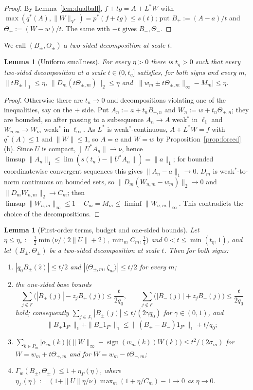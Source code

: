 \documentclass[10pt]{amsart}
\newtheorem{lemma}[theorem]{Lemma}
\theoremstyle{definition}
\theoremstyle{remark}
\newcommand{\sgn}{\operatorname{sign}}
\newcommand{\zh}{\hat z}
\newcommand{\ip}[2]{\langle #1,#2\rangle}
\begin{document}
\begin{proof}
By Lemma~\ref{lem:dualball}, $f+tg=A+L^*W$ with $\max(q^*(A),\|W\|_{V^*})=
p^*(f+tg)\le s(t)$; put $B_+:=(A-a)/t$ and $\Theta_+:=(W-w)/t$.  The same
with $-t$ gives $B_-,\Theta_-$.
\end{proof}

We call $(B_\pm,\Theta_\pm)$ a \emph{two-sided decomposition at scale $t$}.

\begin{lemma}[Uniform smallness]\label{lem:smallness}
For every $\eta>0$ there is $t_\eta>0$ such that every two-sided
decomposition at a scale $t\in(0,t_\eta]$ satisfies, for both signs and
every $m$, $\|tB_\pm\|_1\le\eta$, $\|D_m(t\Theta_{\pm,m})\|_2\le\eta$ and
$\big|\|w_m\pm t\Theta_{\pm,m}\|_\infty-M_m\big|\le\eta$.
\end{lemma}

\begin{proof}
Otherwise there are $t_n\to0$ and decompositions violating one of the
inequalities, say on the $+$ side.  Put $A_n:=a+t_nB_{+,n}$ and
$W_n:=w+t_n\Theta_{+,n}$; they are bounded, so after passing to a
subsequence $A_n\to A$ weak$^*$ in $\ell_1$ and $W_{n,m}\to W_m$ weak$^*$ in
$\ell_\infty$.  As $L^*$ is weak$^*$-continuous, $A+L^*W=f$ with
$q^*(A)\le1$ and $\|W\|\le1$, so $A=a$ and $W=w$ by
Proposition~\ref{prop:forced}(b).  Since $U$ is compact, $\|U^*A_n\|\to\nu$,
hence $\limsup\|A_n\|_1\le\lim(s(t_n)-\|U^*A_n\|)=\|a\|_1$; for bounded
coordinatewise convergent sequences this gives $\|A_n-a\|_1\to0$.  $D_m$ is
weak$^*$-to-norm continuous on bounded sets, so $\|D_m(W_{n,m}-w_m)\|_2\to0$
and $\|D_mW_{n,m}\|_2\to C_m$; then $\limsup\|W_{n,m}\|_\infty\le
1-C_m=M_m\le\liminf\|W_{n,m}\|_\infty$.  This contradicts the choice of the
decompositions.
\end{proof}

\begin{lemma}[First-order terms, budget and one-sided bounds]\label{lem:budget}
Let $\eta\le\eta_*:=\frac12\min\big(\nu/(2\|U\|+2),\min_mC_m,\frac14\big)$
and $0<t\le\min(t_\eta,1)$, and let $(B_\pm,\Theta_\pm)$ be a two-sided
decomposition at scale $t$.  Then for both signs:
\begin{enumerate}
\item[(a)] $|q_0B_\pm(\zh)|\le t/2$ and $|\ip{\Theta_{\pm,m}}{\zeta_m}|\le
t/2$ for every $m$;
\item[(b)] the one-sided base bounds
\[
 \sum_{j\notin F}\big(|B_+(j)|-z_jB_+(j)\big)\le\frac t{2q_0},\qquad
 \sum_{j\notin F}\big(|B_-(j)|+z_jB_-(j)\big)\le\frac t{2q_0}
\]
hold; consequently $\sum_{j\in J_\gamma}|B_\pm(j)|\le t/(2\gamma q_0)$ for
$\gamma\in(0,1)$, and
\[
 \|B_+1_{F^c}\|_1+\|B_-1_{F^c}\|_1\le\|(B_+-B_-)1_{F^c}\|_1+t/q_0;
\]
\item[(c)] $\sum_{k\in P_m}|\alpha_m(k)|\big(\|W\|_\infty-\sgn(w_m(k))W(k)
\big)\le t^2/(2\sigma_m)$ for $W=w_m+t\Theta_{+,m}$ and for
$W=w_m-t\Theta_{-,m}$;
\item[(d)] $\Gamma_w(B_\pm,\Theta_\pm)\le1+\eta_\Gamma(\eta)$, where
$\eta_\Gamma(\eta):=(1+\|U\|\eta/\nu)\max_m(1+\eta/C_m)-1\to0$ as $\eta\to0$.
\end{enumerate}
\end{lemma}
\end{document}
